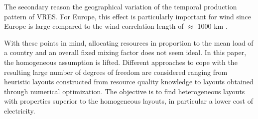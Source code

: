 \documentclass[a4paper, 5p, sort&compress]{elsarticle}%
\begin{document}



The secondary reason the geographical variation of the temporal
production pattern of VRES. For Europe, this effect is particularly
important for wind since Europe is large compared to the wind
correlation length of $\approx$ 1000 km \cite{Widen2011}.

With these points in mind, allocating resources in proportion to the
mean load of a country and an overall fixed mixing factor does not
seem ideal. In this paper, the homogeneous assumption is
lifted. Different approaches to cope with the resulting large number
of degrees of freedom are considered ranging from heuristic layouts
constructed from resource quality knowledge to layouts obtained
through numerical optimization. The objective is to find heterogeneous
layouts with properties superior to the homogeneous layouts, in
particular a lower cost of electricity.



\end{document}
